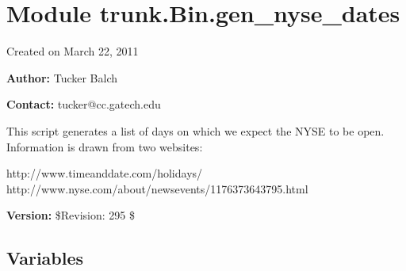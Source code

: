 %
%
%


\section{Module trunk.Bin.gen\_nyse\_dates}

    \label{trunk:Bin:gen_nyse_dates}
Created on March 22, 2011

\textbf{Author:} Tucker Balch



\textbf{Contact:} tucker@cc.gatech.edu

This script generates a list of days on which we expect the NYSE to be 
open.  Information is drawn from two websites:

http://www.timeanddate.com/holidays/ 
http://www.nyse.com/about/newsevents/1176373643795.html



\textbf{Version:} \$Revision: 295 \$





  \subsection{Variables}

